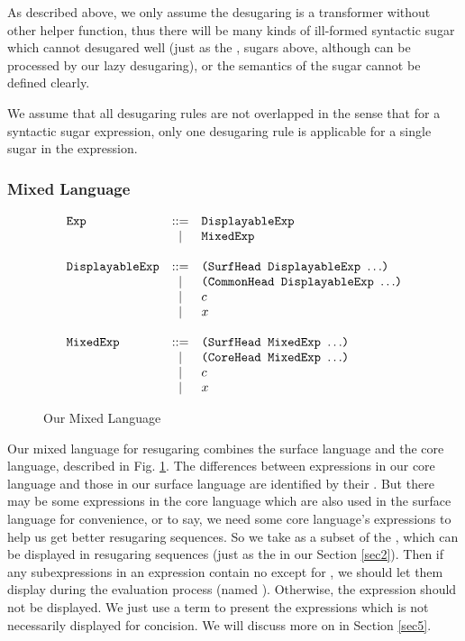 As described above, we only assume the desugaring is a transformer without other helper function, thus there will be many kinds of ill-formed syntactic sugar which cannot desugared well (just as the ,  sugars above, although can be processed by our lazy desugaring), or the semantics of the sugar cannot be defined clearly. 

We assume that all desugaring rules are not overlapped in the sense that for a syntactic sugar expression, only one desugaring rule is applicable for a single sugar in the expression.


\subsubsection{Mixed Language}
\begin{figure}[t]
\begin{centering}
{\footnotesize
\[
			\begin{array}{lcl}
			\mbox{\tt Exp} &::=& \mbox{\tt DisplayableExp}\\
			&|& \mbox{\tt MixedExp}\\
			\\
			\mbox{\tt DisplayableExp} &::=& \mbox{\tt (SurfHead~DisplayableExp~$\ldots$)}\\
			&|& \mbox{\tt (CommonHead~DisplayableExp~$\ldots$)}\\
			&|& c\\
			&|& x\\
			\\
			\mbox{\tt MixedExp} &::=& \mbox{\tt (SurfHead~MixedExp~$\ldots$)}\\
			&|& \mbox{\tt (CoreHead~MixedExp~$\ldots$)}\\
			&|& c\\
			&|& x\\
			\end{array}
			\]
}

\end{centering}
\caption{Our Mixed Language}
\label{fig:mix}
\end{figure}

Our mixed language for resugaring combines the surface language and the core language, described in Fig.  \ref{fig:mix}. 
%
The differences between expressions in our core language and those in our surface language are identified by their . But there may be some expressions in the core language which are also used in the surface language for convenience, or to say, we need some core language's expressions to help us get better resugaring sequences. So we take  as a subset of the , which can be displayed in resugaring sequences (just as the  in our Section \ref{sec2}). Then if any subexpressions in an expression contain no  except for , we should let them display during the evaluation process (named ). Otherwise, the expression should not be displayed. We just use a  term to present the expressions which is not necessarily displayed for concision. We will discuss more on   in Section \ref{sec5}.

